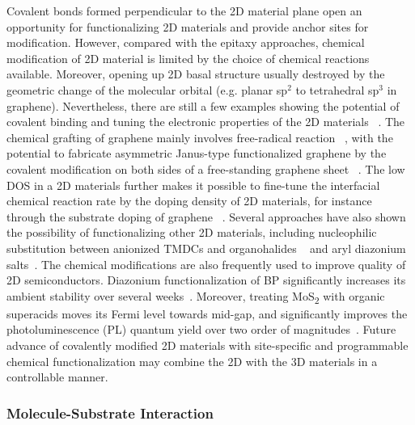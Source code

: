 Covalent bonds formed perpendicular to the 2D material plane open an
opportunity for functionalizing 2D materials and provide anchor sites
for modification. However, compared with the epitaxy approaches,
chemical modification of 2D material is limited by the choice of
chemical reactions available. Moreover, opening up 2D basal structure
usually destroyed by the geometric change of the molecular orbital
(e.g. planar sp\(^{\text{2}}\) to tetrahedral sp\(^{\text{3}}\) in
graphene). Nevertheless, there are still a few examples showing the
potential of covalent binding and tuning the electronic properties of
the 2D materials
~\autocite{Georgakilas_2012_noncoval_gr_rev,Lee_2011_tempo_gr,Zhang_2013_janus_gr,Voiry_2014_cov_TMDC_phase,Vishnoi_2016_ar_mos2_covalent,Liu_2011_rev_chem_dope_gr,Wang_2012_ar_gr_react_rate}.
%
The chemical grafting of graphene mainly involves free-radical
reaction
~\autocite{Lee_2011_tempo_gr,Choi_2010_aminotempo_gr,Zhang_2013_janus_gr,Wang_2012_ar_gr_react_rate,Kumar_2014_2D_MOF_gr},
%
with the potential to fabricate asymmetric Janus-type functionalized
graphene by the covalent modification on both sides of a free-standing
graphene sheet ~\autocite{Zhang_2013_janus_gr}. The low DOS in a 2D
materials further makes it possible to fine-tune the interfacial
chemical reaction rate by the doping density of 2D materials, for
instance through the substrate doping of graphene
~\autocite{Wang_2012_ar_gr_react_rate}. Several approaches have also shown
the possibility of functionalizing other 2D materials, including
nucleophilic substitution between anionized TMDCs and organohalides
~\autocite{Vishnoi_2016_ar_mos2_covalent} and aryl diazonium
salts~\autocite{Ryder_2016_TMDC_ad,Ryder_2016_phosphorene_ad}. The chemical modifications are also
frequently used to improve quality of 2D semiconductors.
%
Diazonium functionalization of BP significantly increases its ambient
stability over several
weeks~\autocite{Ryder_2016_phosphorene_ad}. Moreover, treating
MoS\textsubscript{2} with organic super\-acids moves its Fermi level
towards mid-gap, and significantly improves the
photo\-luminescence (PL) quantum yield over two order of
magnitudes~\autocite{Amani_2015_mos2_QY1}.
%
Future advance of covalently
modified 2D materials with site-specific and programmable chemical
functionalization may combine the 2D with the 3D materials in a
controllable manner.

\subsubsection{Molecule-Substrate Interaction}
\label{sec:intro-mol-subst}

